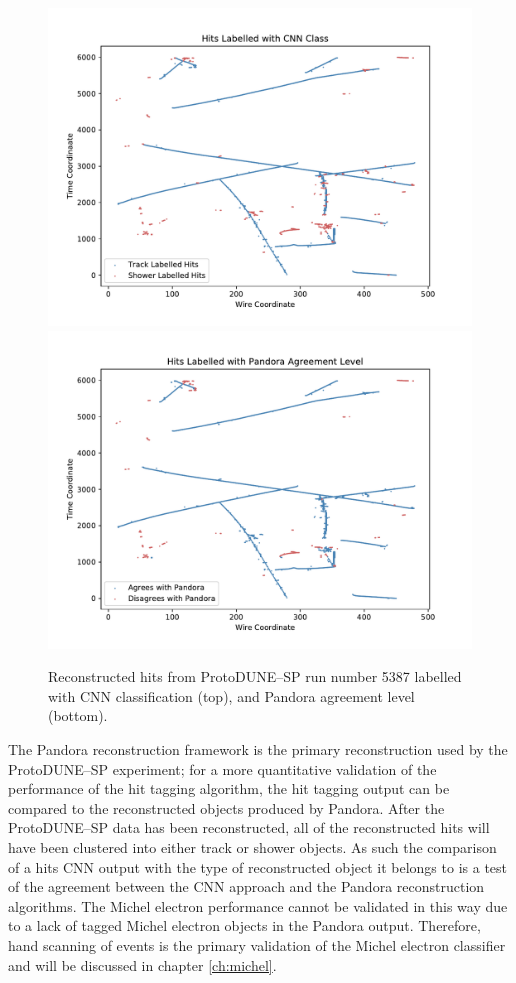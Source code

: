 \begin{figure}[h]
	\centering
	\includegraphics[height=0.45\textheight]{figures/track_score.pdf}
	\includegraphics[height=0.45\textheight]{figures/pandora_agreement.pdf} 
	\caption[CNN output on an event from ProtoDUNE--SP data.]{Reconstructed
	hits from ProtoDUNE--SP run number 5387 labelled with CNN classification
	(top), and Pandora agreement level (bottom).}
	\label{fig:real_event}
\end{figure}

The Pandora reconstruction framework is the primary reconstruction used by the
ProtoDUNE--SP experiment; for a more quantitative validation of the performance
of the hit tagging algorithm, the hit tagging output can be compared to the
reconstructed objects produced by Pandora. After the ProtoDUNE--SP data has been
reconstructed, all of the reconstructed hits will have been clustered into
either track or shower objects. As such the comparison of a hits CNN output with
the type of reconstructed object it belongs to is a test of the agreement
between the CNN approach and the Pandora reconstruction algorithms. The Michel
electron performance cannot be validated in this way due to a lack of tagged
Michel electron objects in the Pandora output. Therefore, hand scanning of
events is the primary validation of the Michel electron classifier and will be
discussed in chapter \ref{ch:michel}.

